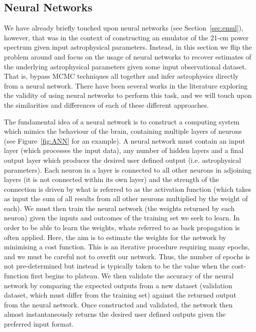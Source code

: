 \subsection{Neural Networks} \label{sec:NN}

We have already briefly touched upon neural networks (see Section~\ref{sec:emul}), however, that was in the context of constructing an emulator of the 21-cm power spectrum given input astrophysical parameters. Instead, in this section we flip the problem around and focus on the usage of neural networks to recover estimates of the underlying astrophysical parameters given some input observational dataset. That is, bypass MCMC techniques all together and infer astrophysics directly from a neural network. There have been several works in the literature exploring the validity of using neural networks to perform this task, and we will touch upon the similarities and differences of each of these different approaches.

The fundamental idea of a neural network is to construct a computing system which mimics the behaviour of the brain, containing multiple layers of neurons (see Figure~\ref{fig:ANN} for an example). A neural network must contain an input layer (which processes the input data), any number of hidden layers and a final output layer which produces the desired user defined output (i.e. astrophysical parameters). Each neuron in a layer is connected to all other neurons in adjoining layers (it is not connected within its own layer) and the strength of the connection is driven by what is referred to as the activation function (which takes as input the sum of all results from all other neurons multiplied by the weight of each). We must then train the neural network (the weights returned by each neuron) given the inputs and outcomes of the training set we seek to learn. In order to be able to learn the weights, whats referred to as back propagation is often applied. Here, the aim is to estimate the weights for the network by minimising a cost function. This is an iterative procedure requiring many epochs, and we must be careful not to overfit our network. Thus, the number of epochs is not pre-determined but instead is typically taken to be the value when the cost-function first begins to plateau. We then validate the accuracy of the neural network by comparing the expected outputs from a new dataset (validation dataset, which must differ from the training set) against the returned output from the neural network. Once constructed and validated, the network then almost instantaneously returns the desired user defined outputs given the preferred input format.

